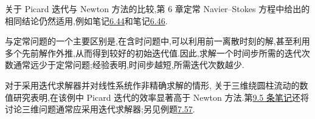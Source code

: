 \begin{note}
\label{note:time-dependent-picard-newton-comparison}
关于 Picard 迭代与 Newton 方法的比较,第 6 章定常 Navier--Stokes 方程中给出的相同结论仍然适用,例如笔记\hyperref[note:steady-ns-newton-convergence]{6.44}和笔记\hyperref[note:steady-ns-velocity-coupling-cost]{6.46}.

与定常问题的一个主要区别是,在含时问题中,可以利用前一离散时刻的解,甚至利用多个先前解作外推,从而得到较好的初始迭代值.因此,求解一个时间步所需的迭代次数通常远少于定常问题;经验表明,时间步越短,所需迭代次数越少.

对于采用迭代求解器并对线性系统作非精确求解的情形,\textcite{JohnMatthiesRang2006a} 关于三维绕圆柱流动的数值研究表明,在该例中 Picard 迭代的效率显著高于 Newton 方法.第\hyperref[note:chapter9-solver-choice]{9.5 条笔记}还将讨论三维问题通常应采用迭代求解器;另见例题\hyperref[ex:time-dependent-picard-vs-newton]{7.57}.
\end{note}


